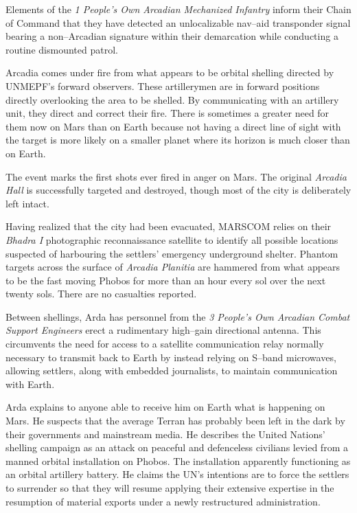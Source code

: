 

Elements of the {\it 1 People's Own Arcadian Mechanized Infantry} inform their Chain of Command that they have detected an unlocalizable nav--aid transponder signal bearing a non--Arcadian signature within their demarcation while conducting a routine dismounted patrol.
\StopTimelineDate

Arcadia comes under fire from what appears to be orbital shelling directed by UNMEPF's forward observers. These artillerymen are in forward positions directly overlooking the area to be shelled. By communicating with an artillery unit, they direct and correct their fire. There is sometimes a greater need for them now on Mars than on Earth because not having a direct line of sight with the target is more likely on a smaller planet where its horizon is much closer than on Earth. 

The event marks the first shots ever fired in anger on Mars. The original {\it Arcadia Hall} is successfully targeted and destroyed, though most of the city is deliberately left intact. 

Having realized that the city had been evacuated, MARSCOM relies on their {\it Bhadra I} photographic reconnaissance satellite to identify all possible locations suspected of harbouring the settlers' emergency underground shelter. Phantom targets across the surface of {\it Arcadia Planitia} are hammered from what appears to be the fast moving Phobos for more than an hour every sol over the next twenty sols. There are no casualties reported.

Between shellings, Arda has personnel from the {\it 3 People's Own Arcadian Combat Support Engineers} erect a rudimentary high--gain directional antenna. This circumvents the need for access to a satellite communication relay normally necessary to transmit back to Earth by instead relying on S--band microwaves, allowing settlers, along with embedded journalists, to maintain communication with Earth.

Arda explains to anyone able to receive him on Earth what is happening on Mars. He suspects that the average Terran has probably been left in the dark by their governments and mainstream media. He describes the United Nations' shelling campaign as an attack on peaceful and defenceless civilians levied from a manned orbital installation on Phobos. The installation apparently functioning as an orbital artillery battery. He claims the UN's intentions are to force the settlers to surrender so that they will resume applying their extensive expertise in the resumption of material exports under a newly restructured administration.

